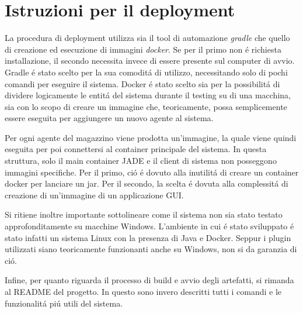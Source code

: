 \section{Istruzioni per il deployment}


La procedura di deployment utilizza sia il tool di automazione \textit{gradle} che quello di creazione ed esecuzione di immagini \textit{docker}. Se per il primo non \'e richiesta installazione, il secondo necessita invece di essere presente sul computer di avvio.\\
Gradle \'e stato scelto per la sua comodit\'a di utilizzo, necessitando solo di pochi comandi per eseguire il sistema. Docker \'e stato scelto sia per la possibilit\'a di dividere logicamente le entit\'a del sistema durante il testing su di una macchina, sia con lo scopo di creare un immagine che, teoricamente, possa semplicemente essere eseguita per aggiungere un nuovo agente al sistema.

\parag
Per ogni agente del magazzino viene prodotta un'immagine, la quale viene quindi eseguita per poi connettersi al container principale del sistema. In questa struttura, solo il main container JADE e il client di sistema non posseggono immagini specifiche. Per il primo, ci\'o \'e dovuto alla inutilit\'a di creare un container docker per lanciare un jar. Per il secondo, la scelta \'e dovuta alla complessit\'a di creazione di un'immagine di un applicazione GUI.

\parag
Si ritiene inoltre importante sottolineare come il sistema non sia stato testato approfonditamente su macchine Windows. L'ambiente in cui \'e stato sviluppato \'e stato infatti un sistema Linux con la presenza di Java e Docker. Seppur i plugin utilizzati siano teoricamente funzionanti anche su Windows, non si da garanzia di ci\'o.

\parag
Infine, per quanto riguarda il processo di build e avvio degli artefatti, si rimanda al README del progetto. In questo sono invero descritti tutti i comandi e le funzionalit\'a pi\'u utili del sistema.

